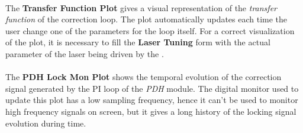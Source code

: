 \paragraph{} The \textbf{Transfer Function Plot} gives a visual representation of the \textit{transfer function} of the correction loop. The plot automatically updates each time the user change one of the parameters for the loop itself. For a correct visualization of the plot, it is necessary to fill the \textbf{Laser Tuning} form with the actual parameter of the laser being driven by the \QubeModel .

\paragraph{} The \textbf{PDH Lock Mon Plot} shows the temporal evolution of the correction signal generated by the PI loop of the \textit{PDH} module. The digital monitor used to update this plot has a low sampling frequency, hence it can't be used to monitor high frequency signals on screen, but it gives a long history of the locking signal evolution during time.





